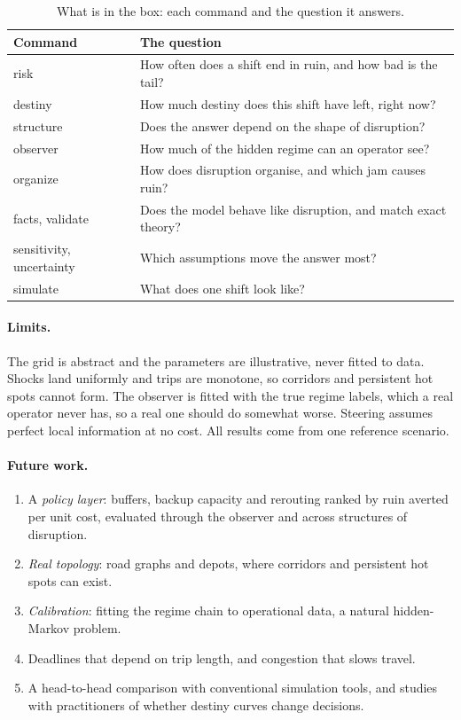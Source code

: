 \documentclass[10pt,twocolumn,a4paper]{article}
\begin{document}
\begin{table}[t]
\centering\small
\caption{What is in the box: each command and the question it answers.}
\label{tab:box}
\renewcommand{\arraystretch}{1.1}
\begin{tabular}{@{}>{\ttfamily\footnotesize}p{}>{\raggedright\arraybackslash}p{}@{}}
\toprule
\normalfont Command & \normalfont The question \\
\midrule
risk & How often does a shift end in ruin, and how bad is the tail? \\
destiny & How much destiny does this shift have left, right now? \\
structure & Does the answer depend on the shape of disruption? \\
observer & How much of the hidden regime can an operator see? \\
organize & How does disruption organise, and which jam causes ruin? \\
facts, validate & Does the model behave like disruption, and match exact theory? \\
sensitivity, uncertainty & Which assumptions move the answer most? \\
simulate & What does one shift look like? \\
\bottomrule
\end{tabular}
\end{table}

\paragraph{Limits.} The grid is abstract and the parameters are illustrative, never fitted to data. Shocks land uniformly and trips are monotone, so corridors and persistent hot spots cannot form. The observer is fitted with the true regime labels, which a real operator never has, so a real one should do somewhat worse. Steering assumes perfect local information at no cost. All results come from one reference scenario.

\paragraph{Future work.}
\begin{enumerate}[leftmargin=1.4em,itemsep=1pt,parsep=0pt,topsep=2pt,label=\arabic*.]
\item A \emph{policy layer}: buffers, backup capacity and rerouting ranked by ruin averted per unit cost, evaluated through the observer and across structures of disruption.
\item \emph{Real topology}: road graphs and depots, where corridors and persistent hot spots can exist.
\item \emph{Calibration}: fitting the regime chain to operational data, a natural hidden-Markov problem.
\item Deadlines that depend on trip length, and congestion that slows travel.
\item A head-to-head comparison with conventional simulation tools, and studies with practitioners of whether destiny curves change decisions.
\end{enumerate}
\end{document}
